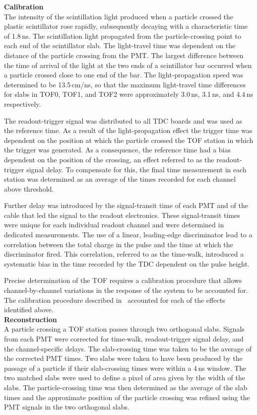 \noindent\textbf{Calibration} \\
\noindent
The intensity of the scintillation light produced when a particle
crossed the plastic scintillator rose rapidly, subsequently decaying
with a characteristic time of 1.8\,ns. 
The scintillation light propagated from the particle-crossing point to
each end of the scintillator slab.
The light-travel time was dependent on the distance of the particle
crossing from the PMT.
The largest difference between the time of arrival of the light at the
two ends of a scintillator bar occurred when a particle crossed close
to one end of the bar.
The light-propagation speed was determined to be 13.5\,cm/ns, so that the maximum light-travel time differences
for slabs in TOF0, TOF1, and TOF2 were approximately 3.0\,ns, 3.1\,ns,
and 4.4\,ns respectively.

The readout-trigger signal was distributed to all TDC boards and was
used as the reference time.
As a result of the light-propagation effect the trigger time was
dependent on the position at which the particle crossed the TOF
station in which the trigger was generated.
As a consequence, the reference time had a bias dependent on
the position of the crossing, an effect referred to as the
readout-trigger signal delay.
To compensate for this, the final time measurement in each station was
determined as an average of the times recorded for each channel above
threshold.

Further delay was introduced by the signal-transit time of each PMT
and of the cable that led the signal to the readout electronics.
These signal-transit times were unique for each individual readout
channel and were determined in dedicated measurements.
The use of a linear, leading-edge discriminator lead to a correlation
between the total charge in the pulse and the time at which the
discriminator fired.
This correlation, referred to as the time-walk, introduced a
systematic bias in the time recorded by the TDC dependent on the pulse
height. 

Precise determination of the TOF requires a calibration procedure that
allows channel-by-channel variations in the response of the system to
be accounted for.
The calibration procedure described in~\cite{NOTE251} accounted for
each of the effects identified above. \\

\noindent\textbf{Reconstruction} \\
\noindent
A particle crossing a TOF station passes through two orthogonal
slabs.
Signals from each PMT were corrected for time-walk, readout-trigger
signal delay, and the channel-specific delays.
The slab-crossing time was taken to be the average of the corrected
PMT times.
Two slabs were taken to have been produced by the passage of a
particle if their slab-crossing times were within a 4\,ns window.
The two matched slabs were used to define a pixel of area given by the
width of the slabs.
The particle-crossing time was then determined as the average of the
slab times and the approximate position of the particle crossing was
refined using the PMT signals in the two orthogonal slabs. \\

